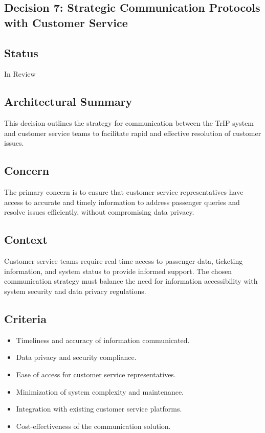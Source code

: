 \subsection{Decision 7: Strategic Communication Protocols with Customer Service}

\subsection*{Status}
In Review

\subsection*{Architectural Summary}
This decision outlines the strategy for communication between the TrIP system and customer service teams to facilitate rapid and effective resolution of customer issues.

\subsection*{Concern}
The primary concern is to ensure that customer service representatives have access to accurate and timely information to address passenger queries and resolve issues efficiently, without compromising data privacy.

\subsection*{Context}
Customer service teams require real-time access to passenger data, ticketing information, and system status to provide informed support. The chosen communication strategy must balance the need for information accessibility with system security and data privacy regulations.

\subsection*{Criteria}
\begin{itemize}
    \item Timeliness and accuracy of information communicated.
    \item Data privacy and security compliance.
    \item Ease of access for customer service representatives.
    \item Minimization of system complexity and maintenance.
    \item Integration with existing customer service platforms.
    \item Cost-effectiveness of the communication solution.
\end{itemize}

